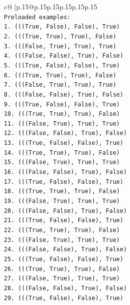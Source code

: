 \documentclass{article}
\begin{document}
{\begin{supertabular}{c@{$\;$}|p{.15\linewidth}@{}p{.15\linewidth}p{.15\linewidth}p{.15\linewidth}p{.15\linewidth}p{.15\linewidth}}
{{{\\ 
\texttt{Preloaded examples:} \\
\texttt{1. (((True, False), False), True)} \\
\texttt{2. (((True, True), True), False)} \\
\texttt{3. (((False, True), True), True)} \\
\texttt{4. (((False, False), True), False)} \\
\texttt{5. (((True, False), False), True)} \\
\texttt{6. (((True, True), True), False)} \\
\texttt{7. (((False, True), True), True)} \\
\texttt{8. (((False, False), True), False)} \\
\texttt{9. (((True, False), False), True)} \\
\texttt{10. (((True, True), True), False)} \\
\texttt{11. (((False, True), True), True)} \\
\texttt{12. (((False, False), True), False)} \\
\texttt{13. (((True, False), False), True)} \\
\texttt{14. (((True, True), True), False)} \\
\texttt{15. (((False, True), True), True)} \\
\texttt{16. (((False, False), True), False)} \\
\texttt{17. (((True, False), False), True)} \\
\texttt{18. (((True, True), True), False)} \\
\texttt{19. (((False, True), True), True)} \\
\texttt{20. (((False, False), True), False)} \\
\texttt{21. (((True, False), False), True)} \\
\texttt{22. (((True, True), True), False)} \\
\texttt{23. (((False, True), True), True)} \\
\texttt{24. (((False, False), True), False)} \\
\texttt{25. (((True, False), False), True)} \\
\texttt{26. (((True, True), True), False)} \\
\texttt{27. (((False, True), True), True)} \\
\texttt{28. (((False, False), True), False)} \\
\texttt{29. (((True, False), False), True)} \\
}}}
\end{supertabular}}
\end{document}
